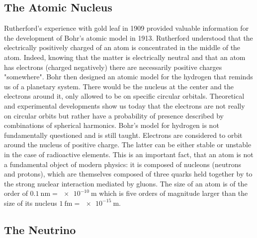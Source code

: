 \subsection{The Atomic Nucleus}

Rutherford's experience with gold leaf in 1909 provided valuable information for the development of Bohr's atomic model in 1913. Rutherford understood that the electrically positively charged of an atom is concentrated in the middle of the atom. Indeed, knowing that the matter is electrically neutral and that an atom has electrons (charged negatively) there are necessarily positive charges "somewhere". Bohr then designed an atomic model for the hydrogen that reminds us of a planetary system. There would be the nucleus at the center and the electrons around it, only allowed to be on specific circular orbitals.
Theoretical and experimental developments show us today that the electrons are not really on circular orbits but rather have a probability of presence described by combinations of spherical harmonics. Bohr's model for hydrogen is not fundamentally questioned and is still taught. Electrons are considered to orbit around the nucleus of positive charge. The latter can be either stable or unstable in the case of radioactive elements. 
This is an important fact, that an atom is not a fundamental object of modern physics: it is composed of nucleons (neutrons and protons), which are themselves composed of three quarks held together by to the strong nuclear interaction mediated by gluons. The size of an atom is of the order of $\SI{0.1}{\nano\m} = \SI{e-10}{\m}$ which is five orders of magnitude larger than the size of its nucleus $\SI{1}{\femto\m} = \SI{e-15}{\m}$.


\subsection{The Neutrino}

